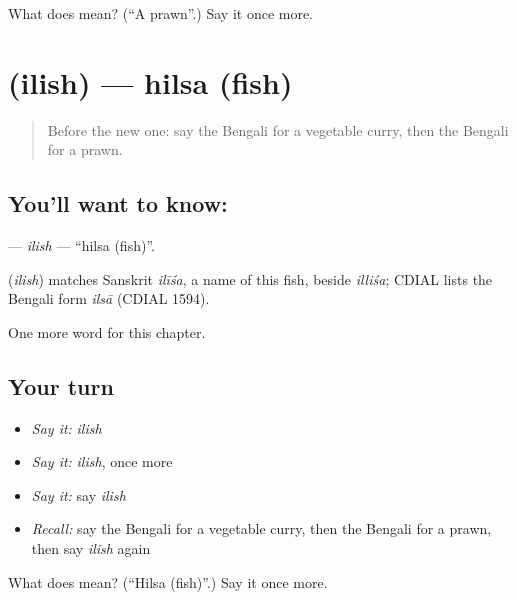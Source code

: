 \begin{tcolorbox}[breakable,colback=teal!4,colframe=teal!35!black,title={Before you move on}]
What does  mean? (\textquotedblleft{}A prawn\textquotedblright{}.) Say it once more.
\end{tcolorbox}
\section[\texorpdfstring{\bn{ইলিশ} (ilish)}{ইলিশ (ilish)}]{ (ilish) — hilsa (fish)}

\label{lesson:BN-C223-ilish}



\begin{quote}
Before the new one: say the Bengali for a vegetable curry, then the Bengali for a prawn.
\end{quote}

\subsection*{You'll want to know: }
\textbf{} — \emph{ilish} — \textquotedblleft{}hilsa (fish)\textquotedblright{}.

\begin{cousinweb}
\textbf{} (\emph{ilish}) matches Sanskrit \emph{ilīśa}, a name of this fish, beside \emph{illiśa}; CDIAL lists the Bengali form \emph{ilsā} (CDIAL 1594).
\end{cousinweb}

\begin{grammarlens}[title={What you've built}]
One more word for this chapter.
\end{grammarlens}

\subsection*{Your turn}
\begin{itemize}
\raggedright
  \item \emph{Say it:} \emph{ilish}
  \item \emph{Say it:} \emph{ilish}, once more
  \item \emph{Say it:} say \emph{ilish}
  \item \emph{Recall:} say the Bengali for a vegetable curry, then the Bengali for a prawn, then say \emph{ilish} again
\end{itemize}

\begin{tcolorbox}[breakable,colback=teal!4,colframe=teal!35!black,title={Before you move on}]
What does  mean? (\textquotedblleft{}Hilsa (fish)\textquotedblright{}.) Say it once more.
\end{tcolorbox}
